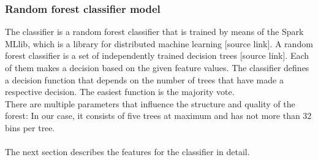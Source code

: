 \subsubsection{Random forest classifier model}
The classifier is a random forest classifier that is trained by means of the Spark MLlib, which is a library for distributed machine learning [source link]. A random forest classifier is a set of independently trained decision trees [source link]. Each of them makes a decision based on the given feature values. The classifier defines a decision function that depends on the number of trees that have made a respective decision. The easiest function is the majority vote.\\
There are multiple parameters that influence the structure and quality of the forest: In our case, it consists of five trees at maximum and has not more than 32 bins per tree.\\
~\\
The next section describes the features for the classifier in detail.